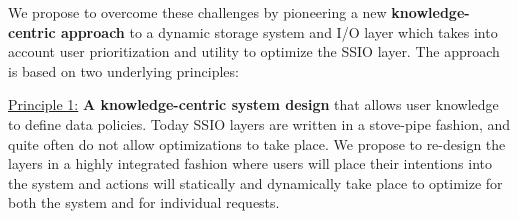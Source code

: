 
%
%
%

We propose to overcome these challenges by pioneering a new {\bf
knowledge-centric approach} to a dynamic storage system and I/O layer which
takes into account user prioritization and utility to optimize the SSIO layer.
The approach is based on two underlying principles:

\underline{Principle 1:} {\bf A knowledge-centric system design} that allows user knowledge  to
define data policies. Today SSIO layers are written in a
stove-pipe fashion, and quite often do not allow optimizations to take place.
We propose to re-design the layers in a highly integrated fashion where users
will place their intentions into the system and actions will statically and dynamically
take place to optimize for both the system and for individual
requests.

